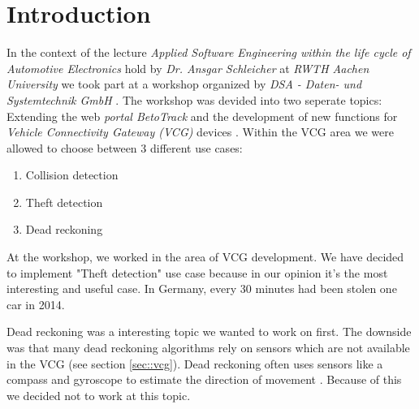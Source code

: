 \chapter{Introduction}

In the context of the lecture \textit{Applied Software Engineering within the life cycle of Automotive Electronics} hold by \textit{Dr. Ansgar Schleicher} at \textit{RWTH Aachen University} we took part at a workshop organized by \textit{DSA - Daten- und Systemtechnik GmbH} \cite{DSA}.
The workshop was devided into two seperate topics: Extending the web \textit{portal BetoTrack} and the development of new functions for \textit{Vehicle Connectivity Gateway (VCG)} devices \cite{WorkshopDescription}. Within the VCG area we were allowed to choose between 3 different use cases: 
\begin{enumerate}
    \item Collision detection
    \item Theft detection
    \item Dead reckoning
\end{enumerate} 
At the workshop, we worked in the area of VCG development. We have decided to implement "Theft detection" use case because in our opinion it's the most interesting and useful case. In Germany, every 30 minutes had been stolen one car in 2014. 

Dead reckoning was a interesting topic we wanted to work on first. The downside was that many dead reckoning algorithms rely on sensors which are not available in the VCG (see section \ref{sec::vcg}). Dead reckoning often uses sensors like a compass and gyroscope to estimate the direction of movement \cite{kao1991integration}. Because of this we decided not to work at this topic.

